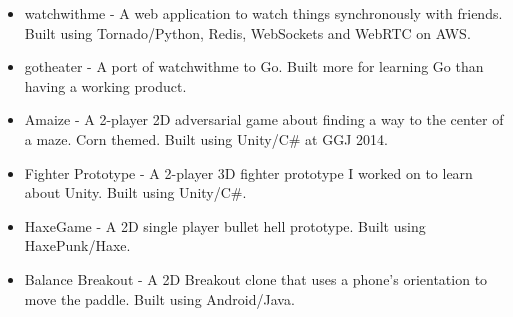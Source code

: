 \documentclass[a4paper]{article}
\begin{document}
        \begin{multicols}{2}
            \begin{itemize}
                \item watchwithme - A web application to watch things synchronously with friends. Built using Tornado/Python, Redis, WebSockets and WebRTC on AWS.
                \item gotheater - A port of watchwithme to Go. Built more for learning Go than having a working product. 
                \item Amaize - A 2-player 2D adversarial game about finding a way to the center of a maze. Corn themed. Built using Unity/C\# at GGJ 2014.
                \item Fighter Prototype - A 2-player 3D fighter prototype I worked on to learn about Unity. Built using Unity/C\#.
                \item HaxeGame - A 2D single player bullet hell prototype. Built using HaxePunk/Haxe.
                \item Balance Breakout - A 2D Breakout clone that uses a phone's orientation to move the paddle. Built using Android/Java.
            \end{itemize}
        \end{multicols}
    \endgroup
\end{document}
